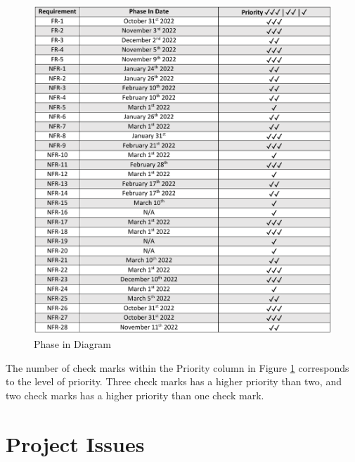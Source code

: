 \documentclass[12pt]{article}
\begin{document}
\begin{figure}[H]
  \begin{center}
    \includegraphics{P-diagram.pdf}
  \caption{Phase in Diagram}
  \label{PhaseDiagram} 
  \end{center}
\end{figure}

\noindent
The number of check marks within the Priority column in Figure \ref{PhaseDiagram} corresponds to the level of priority. Three check marks has a higher priority than two, and two check marks has a higher priority than one check mark.


\section{Project Issues}
\end{document}
